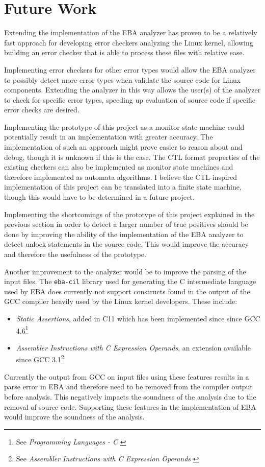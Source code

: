 \section{Future Work}

\newpar Extending the implementation of the EBA analyzer has proven to be a relatively fast approach for developing error checkers analyzing the Linux kernel, allowing building an error checker that is able to process these files with relative ease. 

\newpar Implementing error checkers for other error types would allow the EBA analyzer to possibly detect more error types when validate the source code for Linux components. Extending the analyzer in this way allows the user(s) of the analyzer to check for specific error types, speeding up evaluation of source code if specific error checks are desired. 

\newpar Implementing the prototype of this project as a monitor state machine could potentially result in an implementation with greater accuracy. The implementation of such an approach might prove easier to reason about and debug, though it is unknown if this is the case. The CTL format properties of the existing checkers can also be implemented as monitor state machines and therefore implemented as automata algorithms. I believe the CTL-inspired implementation of this project can be translated into a finite state machine, though this would have to be determined in a future project. 

\newpar Implementing the shortcomings of the prototype of this project explained in the previous section in order to detect a larger number of true positives should be done by improving the ability of the implementation of the EBA analyzer to detect unlock statements in the source code. This would improve the accuracy and therefore the usefulness of the prototype.

\newpar Another improvement to the analyzer would be to improve the parsing of the input files. The \texttt{eba-cil} library used for generating the C intermediate language used by EBA does currently not support constructs found in the output of the GCC compiler heavily used by the Linux kernel developers. These include:
\begin{itemize}
    \item \textit{Static Assertions}, added in C11 which has been implemented since since GCC 4.6\footnote{See \textit{Programming Languages - C} \cite{ISO:2011:IIIb}}
    \item \textit{Assembler Instructions with C Expression Operands}, an extension available since GCC 3.1\footnote{See \textit{Assembler Instructions with C Expression Operands} \cite{GCC:3.1}}
\end{itemize}

\noindent Currently the output from GCC on input files using these features results in a parse error in EBA and therefore need to be removed from the compiler output before analysis. This negatively impacts the soundness of the analysis due to the removal of source code. Supporting these features in the implementation of EBA would improve the soundness of the analysis.